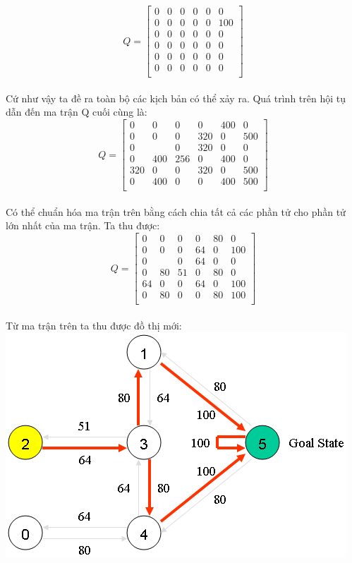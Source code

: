 \documentclass[14pt,a4paper,oneside]{report}		%
\begin{document}
$$Q=\begin{bmatrix}
0&0&0&0&0&0\\
0&0&0&0&0&100\\
0&0&0&0&0&0\\
0&0&0&0&0&0\\
0&0&0&0&0&0\\
0&0&0&0&0&0\\
\end{bmatrix}$$\\
Cứ như vậy ta đề ra toàn bộ các kịch bản có thể xảy ra. Quá trình trên hội tụ dẫn đến ma trận Q cuối cùng là:
$$Q=\begin{bmatrix}
0&0&0&0&400&0\\
0&0&0&320&0&500\\
0&&0&320&0&0\\
0&400&256&0&400&0\\
320&0&0&320&0&500\\
0&400&0&0&400&500\\
\end{bmatrix}$$\\
Có thể chuẩn hóa ma trận trên bằng cách chia tất cả các phần tử cho phần tử lớn nhất của ma trận. Ta thu được:
$$Q=\begin{bmatrix}
0&0&0&0&80&0\\
0&0&0&64&0&100\\
0&&0&64&0&0\\
0&80&51&0&80&0\\
64&0&0&64&0&100\\
0&80&0&0&80&100\\
\end{bmatrix}$$\\
Từ ma trận trên ta thu được đồ thị mới:\\
\includegraphics[width=\textwidth,height=\textheight,keepaspectratio]{5.png}
\end{document}
